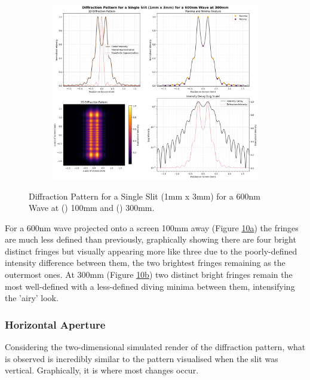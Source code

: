 \documentclass[12pt]{article}
\begin{document}
\begin{figure}[H]
\begin{subfigure}[b]{.48\textwidth}
        \includegraphics[width=\linewidth]{vsslit_600nm_300mm.png}
        \label{fig:10b}
    \end{subfigure}
    \caption{Diffraction Pattern for a Single Slit (1mm x 3mm) for a 600nm Wave at () 100mm and () 300mm.}
    \label{fig:10}
\end{figure}

For a 600nm wave projected onto a screen 100mm away (Figure \hyperref[fig:10a]{10a}) the fringes are much less defined than previously, graphically showing there are four bright distinct fringes but visually appearing more like three due to the poorly-defined
intensity difference between them, the two brightest fringes remaining as the outermost ones. At 300mm (Figure \hyperref[fig:10b]{10b}) two distinct bright fringes remain the most well-defined with a less-defined diving minima between them,
intensifying the 'airy' look.

\subsubsection{Horizontal Aperture}

Considering the two-dimensional simulated render of the diffraction pattern, what is observed is incredibly similar to the pattern visualised when the slit was vertical. Graphically, it is where most changes occur.
\end{document}

